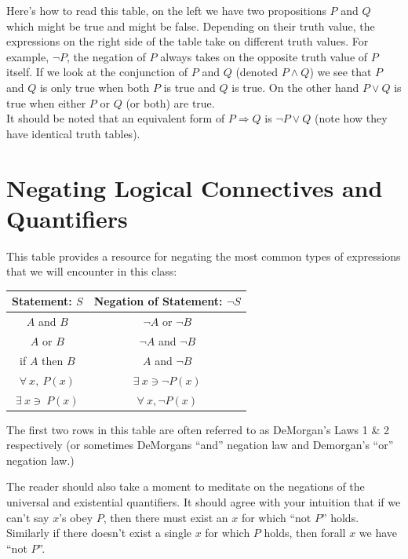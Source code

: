 \noindent Here's how to read this table, on the left we have two propositions $P$ and 
$Q$ which might be true and might be false. Depending on their truth value, the 
expressions on the right side of the table take on different truth values. For example, 
$\lnot P$, the negation of $P$ always takes on the opposite truth value of $P$ itself. 
If we look at the conjunction of $P$ and $Q$ (denoted $P\land Q$) we see that $P$ and 
$Q$ is only true when both $P$ is true and $Q$ is true. On the other hand $P\lor Q$ is 
true when either $P$ or $Q$ (or both) are true. \steezybreak \\

\noindent It should be noted that an equivalent form of $P \Rightarrow Q$ is $\lnot P \lor Q$ (note how they have identical truth tables).


\section{Negating Logical Connectives and Quantifiers}
This table provides a resource for negating the most common types of expressions that we will encounter in this class:
\begin{center}
  \begin{tabular}{|c|c|}\hline
     \textbf{Statement: $S$} & \textbf{Negation of Statement: $\lnot S$}   \\ \hline
     $A$ and $B$ & $\lnot A$ or $\lnot B$  \\ \hline
     $A$ or $B$ & $\lnot A$ and $\lnot B$  \\ \hline 
     if $A$ then $B$ & $A$ and $\lnot B$  \\ \hline
     $\forall \ x, \ P(x)$ & $\exists \ x \ni \lnot P(x)$  \\ \hline
     $\exists \ x \ni \ P(x)$ & $\forall \ x, \lnot P(x)$  \\ \hline
\end{tabular}  
\end{center}
The first two rows in this table are often referred to as DeMorgan's Laws 1 \& 2 respectively (or sometimes DeMorgans ``and'' negation law and Demorgan's ``or'' negation law.) \steezybreak

\noindent The reader should also take a moment to meditate on the negations of the universal and existential quantifiers. It should agree with your intuition that if we can't say  $x$'s obey $P$, then there must exist an $x$ for which ``not $P$'' holds. Similarly if there doesn't exist a single $x$ for which $P$ holds, then forall $x$ we have ``not $P$''.
\newpage 

